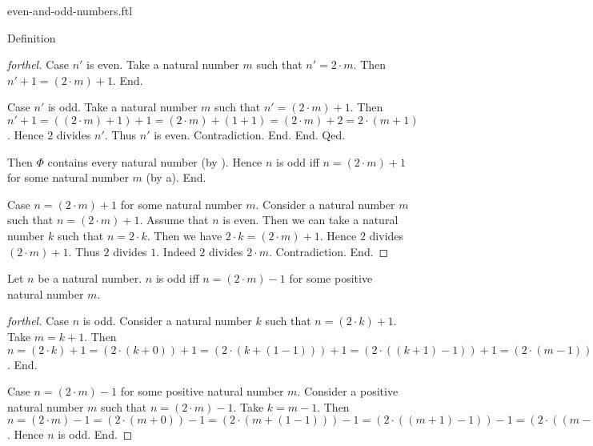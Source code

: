 \documentclass{naproche-library}
\begin{document}
\begin{smodule}[title=Even and Odd Numbers]{even-and-odd-numbers.ftl}
\begin{sfragment}{Definition}
\begin{proof}[forthel]
          Case $n'$ is even.
            Take a natural number $m$ such that $n' = 2 \cdot m$.
            Then $n' + 1 = (2 \cdot m) + 1$.
          End.

          Case $n'$ is odd.
            Take a natural number $m$ such that $n' = (2 \cdot m) + 1$.
            Then $n' + 1
              = ((2 \cdot m) + 1) + 1
              = (2 \cdot m) + (1 + 1)
              = (2 \cdot m) + 2
              = 2 \cdot (m + 1)$.
            Hence $2$ divides $n'$.
            Thus $n'$ is even.
            Contradiction.
          End.
        End.
      Qed.

      Then $\Phi$ contains every natural number (by ).
      Hence $n$ is odd iff $n = (2 \cdot m) + 1$ for some natural number $m$ (by a).
    End.

    Case $n = (2 \cdot m) + 1$ for some natural number $m$.
      Consider a natural number $m$ such that $n = (2 \cdot m) + 1$.
      Assume that $n$ is even.
      Then we can take a natural number $k$ such that $n = 2 \cdot k$.
      Then we have $2 \cdot k = (2 \cdot m) + 1$.
      Hence $2$ divides $(2 \cdot m) + 1$.
      Thus $2$ divides $1$.
      Indeed $2$ divides $2 \cdot m$.
      Contradiction.
    End.
  \end{proof}

  \begin{proposition}[forthel,id=ARITHMETIC_15_1023652154254789]
    Let $n$ be a natural number.
    $n$ is odd iff $n = (2 \cdot m) - 1$ for some positive natural number $m$.
  \end{proposition}
  \begin{proof}[forthel]
    Case $n$ is odd.
      Consider a natural number $k$ such that $n = (2 \cdot k) + 1$.
      Take $m = k + 1$.
      Then $n
        = (2 \cdot k) + 1
        = (2 \cdot (k + 0)) + 1
        = (2 \cdot (k + (1 - 1))) + 1
        = (2 \cdot ((k + 1) - 1)) + 1
        = (2 \cdot (m - 1)) + 1
        = ((2 \cdot m) - (2 \cdot 1)) + 1
        = ((2 \cdot m) - 2) + 1
        = (2 \cdot m) - 1$.
    End.

    Case $n = (2 \cdot m) - 1$ for some positive natural number $m$.
      Consider a positive natural number $m$ such that $n = (2 \cdot m) - 1$.
      Take $k = m - 1$.
      Then $n
        = (2 \cdot m) - 1
        = (2 \cdot (m + 0)) - 1
        = (2 \cdot (m + (1 - 1))) - 1
        = (2 \cdot ((m + 1) - 1)) - 1
        = (2 \cdot ((m - 1) + 1)) - 1
        = (2 \cdot (k + 1)) - 1
        = ((2 \cdot k) + (2 \cdot 1)) - 1
        = ((2 \cdot k) + 2) - 1
        = (2 \cdot k) + (2 - 1)
        = (2 \cdot k) + 1$.
      Hence $n$ is odd.
    End.
  \end{proof}
\end{sfragment}


\end{smodule}
\end{document}
